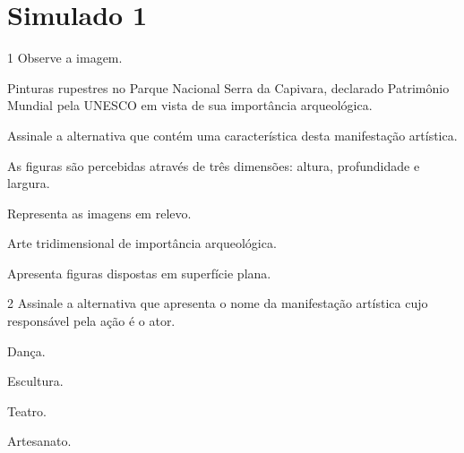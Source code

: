 \chapter{Simulado 1}

\num{1}  Observe a imagem.


Pinturas rupestres no Parque Nacional Serra da Capivara,
declarado Patrimônio Mundial pela UNESCO em vista de sua importância
arqueológica.

Assinale a alternativa que contém uma característica desta manifestação
artística.

\begin{escolha}
\item
  As figuras são percebidas através de três dimensões: altura,
  profundidade e largura.
\item
  Representa as imagens em relevo.
\item
  Arte tridimensional de importância arqueológica.
\item
  Apresenta figuras dispostas em superfície plana.
\end{escolha}


\num{2}  Assinale a alternativa que apresenta o nome da manifestação artística
  cujo responsável pela ação é o ator.

\begin{escolha}
\item
  Dança.
\item
  Escultura.
\item
  Teatro.
\item
  Artesanato.
\end{escolha}

